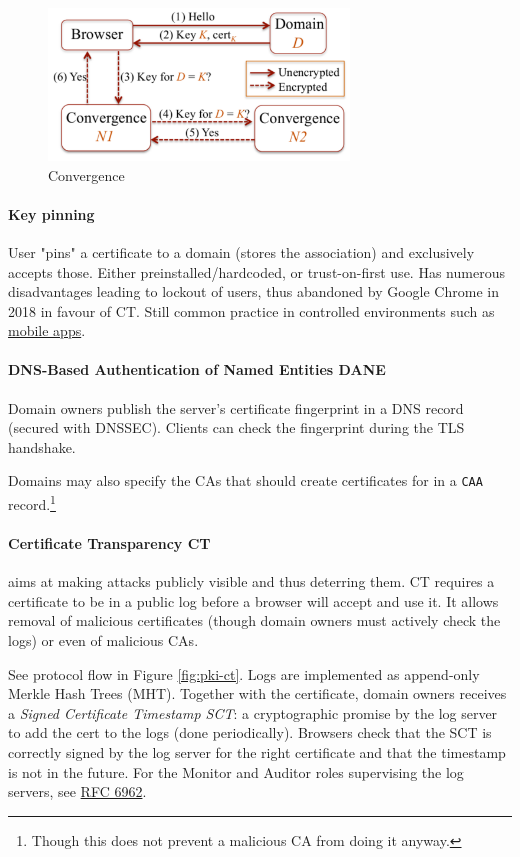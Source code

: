 \begin{figure}[h]
    \centering
    \includegraphics[width=8cm]{images/ch10-pki-convergence.png}
    \caption{Convergence}
    \label{fig:pki-convergence}
\end{figure}

\paragraph{Key pinning} User "pins" a certificate to a domain (stores the association) and exclusively accepts those. Either preinstalled/hardcoded, or trust-on-first use. Has numerous disadvantages leading to lockout of users, thus abandoned by Google Chrome in 2018 in favour of CT. Still common practice in controlled environments such as \href{https://developer.android.com/training/articles/security-config#CertificatePinning}{mobile apps}.

\paragraph{DNS-Based Authentication of Named Entities DANE} Domain owners publish the server's certificate fingerprint in a DNS record (secured with DNSSEC). Clients can check the fingerprint during the TLS handshake.

Domains may also specify the CAs that should create certificates for in a \texttt{CAA} record.\footnote{Though this does not prevent a malicious CA from doing it anyway.}

\paragraph{Certificate Transparency CT} aims at making attacks publicly visible and thus deterring them. CT requires a certificate to be in a public log before a browser will accept and use it. It allows removal of malicious certificates (though domain owners must actively check the logs) or even of malicious CAs.

See protocol flow in Figure \ref{fig:pki-ct}. Logs are implemented as append-only Merkle Hash Trees (MHT). Together with the certificate, domain owners receives a \emph{Signed Certificate Timestamp SCT}: a cryptographic promise by the log server to add the cert to the logs (done periodically). Browsers check that the SCT is correctly signed by the log server for the right certificate and that the timestamp is not in the future.
For the Monitor and Auditor roles supervising the log servers, see \href{https://tools.ietf.org/html/rfc6962}{RFC 6962}.


